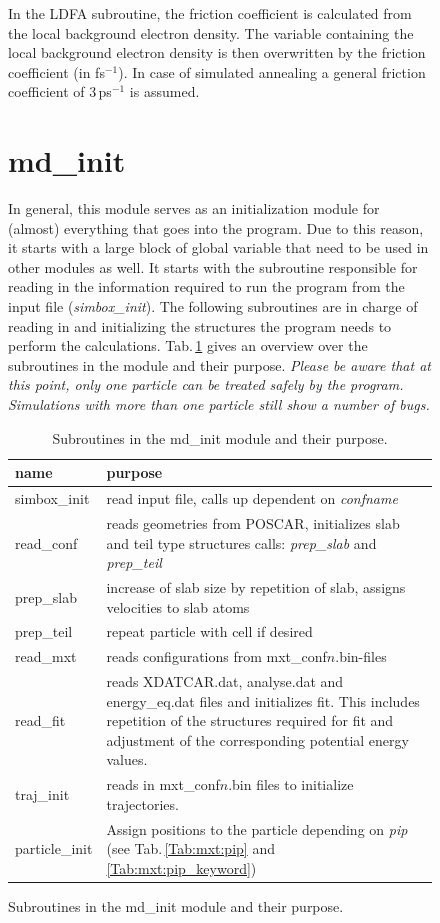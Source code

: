 \documentclass[twoside, 11pt, titlepage, captions=nooneline, a4paper, headsepline]{scrbook}%
\newcommand{\9}{\mathrm}
\newcommand{\0}{\,\mathrm}
\begin{document}
\begin{figure}[b!]
\begin{table}[b!]
\begin{tabular}{lllllll}
\hline
\hline
\end{tabular}
\end{table}

In the LDFA subroutine, the friction coefficient is calculated from the local background electron density. The variable containing the local background electron density is then overwritten by the friction coefficient (in fs$^{-1}$). In case of simulated annealing a general friction coefficient of 3\,ps$^{-1}$ is assumed.

\section{md\_init}
In general, this module serves as an initialization module for (almost) everything that goes into the program. Due to this reason, it starts with a large block of global variable that need to be used in other modules as well.
It starts with the subroutine responsible for reading in the information required to run the program from the input file (\textit{simbox\_init}). The following subroutines are in charge of reading in and initializing the structures the program needs to perform the calculations. Tab.\,\ref{Tab:Funct:mdinit} gives an overview over the subroutines in the module and their purpose. 
\textit{Please be aware that at this point, only one particle can be treated safely by the program. Simulations with more than one particle still show a number of bugs.}
\begin{table}[b!]
\centering
\caption{Subroutines in the md\_init module and their purpose.}
\label{Tab:Funct:mdinit}
\begin{tabular}{l p{12cm}}
\hline\hline
name			&purpose			\\
\hline
simbox\_init & read input file, calls up dependent on \textit{confname}\\
read\_conf& reads geometries from POSCAR, initializes slab and teil type structures\newline
calls: \textit{prep\_slab} and \textit{prep\_teil} \\
prep\_slab& increase of slab size by repetition of slab, assigns velocities to slab atoms\\
prep\_teil& repeat particle with cell if desired\\
read\_mxt&reads configurations from mxt\_conf$n$.bin-files\\
read\_fit&reads XDATCAR.dat, analyse.dat and energy\_eq.dat files and initializes fit. This includes repetition of the structures required for fit and adjustment of the corresponding potential energy values.\\
traj\_init&reads in mxt\_conf$n$.bin files to initialize trajectories.\\
particle\_init& Assign positions to the particle depending on \textit{pip} (see Tab.\,\ref{Tab:mxt:pip} and \ref{Tab:mxt:pip_keyword})\\


\end{tabular}
\end{table}
\end{figure}
\end{document}
